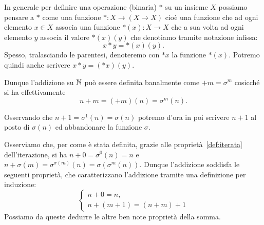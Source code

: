 In generale per definire una operazione (binaria) $*$ su un insieme $X$ possiamo 
pensare a $*$ come una funzione $*\colon X\to (X\to X)$ cioè una funzione che ad ogni 
elemento $x\in X$ associa una funzione $*(x)\colon X \to X$ che a sua volta 
ad ogni elemento $y$ associa il valore $*(x)(y)$ che denotiamo tramite notazione infissa:
\[
  x * y = *(x)(y).  
\]
Spesso, tralasciando le parentesi, denoteremo con $*x$ la funzione $*(x)$.
Potremo quindi anche scrivere $x*y = (*x)(y)$.

Dunque l'addizione su ${\mathbb N}$ può essere definita banalmente come $+m = \sigma^m$ cosicché
si ha effettivamente
\[
  n + m = (+m)(n) = \sigma^m(n).
\]

Osservando che $n+1 = \sigma^1(n) = \sigma(n)$
potremo d'ora in poi scrivere $n+1$ al posto di $\sigma(n)$ 
ed abbandonare la funzione $\sigma$.

Osserviamo che, per come è stata definita,
grazie alle proprietà~\eqref{def:iterata} dell'iterazione, 
si ha $n + 0 = \sigma^0(n) = n$
e $n+\sigma(m) = \sigma^{\sigma(m)}(n) = \sigma(\sigma^m(n))$.
Dunque l'addizione 
soddisfa le seguenti proprietà, che caratterizzano l'addizione 
tramite una definizione per induzione:
\[
  \begin{cases}
    n+0 = n, \\
    n + (m+1) = (n+m) + 1
  \end{cases}
\]
Possiamo da queste dedurre le altre ben note proprietà della somma.

